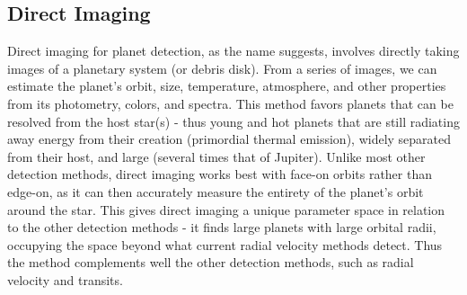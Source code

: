 \documentclass[12pt]{article}
\begin{document}
\subsection*{Direct Imaging}
Direct imaging for planet detection, as the name suggests, involves directly taking images of a planetary system (or debris disk). From a series of images, we can estimate the planet's orbit, size, temperature, atmosphere, and other properties from its photometry, colors, and spectra. This method favors planets that can be resolved from the host star(s) - thus young and hot planets that are still radiating away energy from their creation (primordial thermal emission), widely separated from their host, and large (several times that of Jupiter). Unlike most other detection methods, direct imaging works best with face-on orbits rather than edge-on, as it can then accurately measure the entirety of the planet's orbit around the star. This gives direct imaging a unique parameter space in relation to the other detection methods - it finds large planets with large orbital radii, occupying the space beyond what current radial velocity methods detect. Thus the method complements well the other detection methods, such as radial velocity and transits.\\
\end{document}
